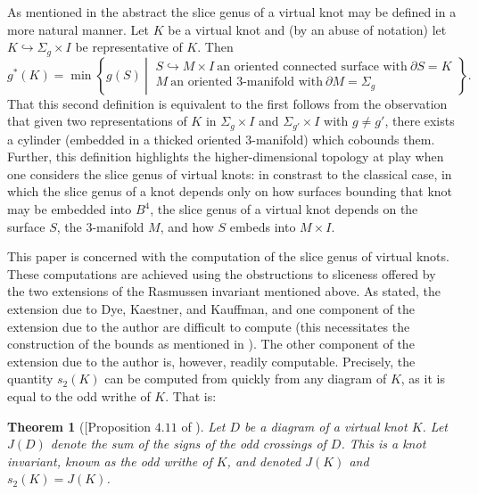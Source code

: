 \documentclass[10pt,oneside]{amsart}
\newtheorem*{theorem*}{Theorem}
\theoremstyle{definition}
\numberwithin{equation}{section}
\begin{document}
As mentioned in the abstract the slice genus of a virtual knot may be defined in a more natural manner. Let \( K \) be a virtual knot and (by an abuse of notation) let \( K \hookrightarrow \Sigma_g \times I \) be representative of \( K \). Then
\begin{equation*}
	g^\ast ( K ) = \min \left\lbrace g ( S ) ~\left|~	
	\begin{matrix}
		S \hookrightarrow M \times I ~\text{an oriented connected surface with}~ \partial S = K \\
		M ~\text{an oriented \(3\)-manifold with}~ \partial M = \Sigma_g
	\end{matrix}
	\right. \right\rbrace .
\end{equation*}
That this second definition is equivalent to the first follows from the observation that given two representations of \( K \) in \( \Sigma_g \times I \) and \( \Sigma_{g'} \times I \) with \( g \neq g' \), there exists a cylinder (embedded in a thicked oriented \(3\)-manifold) which cobounds them. Further, this definition highlights the higher-dimensional topology at play when one considers the slice genus of virtual knots: in constrast to the classical case, in which the slice genus of a knot depends only on how surfaces bounding that knot may be embedded into \(B^4\), the slice genus of a virtual knot depends on the surface \(S\), the \(3\)-manifold \( M \), and how \( S \) embeds into \( M \times I \).

This paper is concerned with the computation of the slice genus of virtual knots. These computations are achieved using the obstructions to sliceness offered by the two extensions of the Rasmussen invariant mentioned above. As stated, the extension due to Dye, Kaestner, and Kauffman, and one component of the extension due to the author are difficult to compute (this necessitates the construction of the bounds as mentioned in ). The other component of the extension due to the author is, however, readily computable. Precisely, the quantity \( s_2 ( K ) \) can be computed from quickly from any diagram of \( K \), as it is equal to the odd writhe of \( K \). That is:

\begin{theorem*}[[Proposition \( 4.11 \) of \cite{Rushworth2017}]
	Let \( D \) be a diagram of a virtual knot \( K \). Let \( J ( D ) \) denote the sum of the signs of the odd crossings of \( D \). This is a knot invariant, known as the odd writhe of \( K \), and denoted \( J ( K ) \) \cite{Kauffman2004b} and \( s_2 ( K ) = J ( K ) \).
\end{theorem*}
\end{document}
